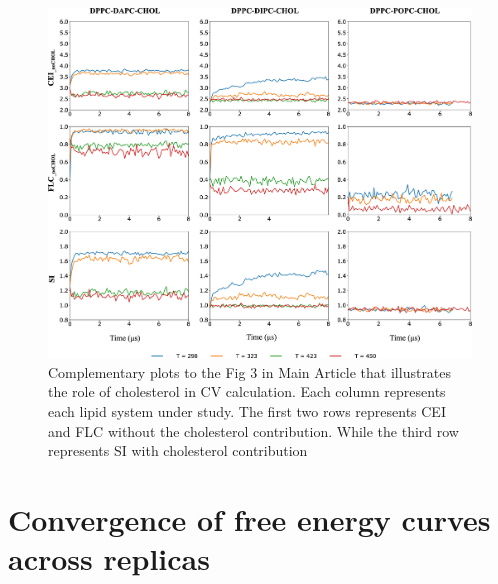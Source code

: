\documentclass[10pt]{article}
\let\oldsection\section
\renewcommand{\section}{\clearpage\oldsection}
\begin{document}
\begin{figure}[H]
    \centering
    \includegraphics[width=6.5in]{Figures/Supplementary/RoleOfCHOL/placeholder.jpg}
    \caption{Complementary plots to the Fig 3 in Main Article that illustrates the role of cholesterol in CV calculation. Each column represents each lipid system under study. The first two rows represents CEI and FLC without the cholesterol contribution. While the third row represents SI with cholesterol contribution}
    \label{figss6:view}
\end{figure}

\section{Convergence of free energy curves across replicas}
\end{document}
